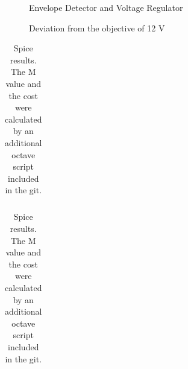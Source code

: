 \begin{figure}[h]
    \centering
{}
  \hfill
{}
\end{figure}

  \begin{figure}[h]
     \centering
     \caption{Envelope Detector and Voltage Regulator}
     \label{fig_2_reação_normal}
 \end{figure}


\begin{figure}[h]
    \centering
{}
  \hfill
{}
\end{figure}

  \begin{figure}[h]
     \centering
     \caption{Deviation from the objective of 12 V}
     \label{fig_2_reação_normal}
 \end{figure}


\begin{table}[h]
  \centering
  \begin{tabular}{|l|r|}
    \hline    
    
  \end{tabular}
  \caption{Spice results. The M value and the cost were calculated by an additional octave script included in the git.}
  \label{tab:info}
\end{table}

\begin{table}[h]
  \centering
  \begin{tabular}{|l|r|}
    \hline    
    
  \end{tabular}
  \caption{Spice results. The M value and the cost were calculated by an additional octave script included in the git.}
  \label{tab:info}
\end{table}


